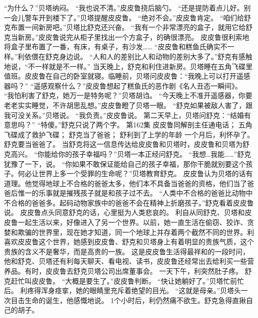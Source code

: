 \documentclass[a4paper,12pt,UTF8,twoside]{ctexbook}
\begin{document}
        “为什么？”贝塔纳闷。 
        “我也说不清。”皮皮鲁挠后脑勺。 
        “还是提防着点儿好。别一会儿警车开到楼下了。”贝塔提醒皮皮鲁。 
        “绝对不会。”皮皮鲁肯定。 
        “咱们给舒克布置一间新房吧。”贝塔比舒克还兴奋。 
        “我有一个非常漂亮的盒子，就用它给舒克当新房。”皮皮鲁说完从柜子里找出一个方盒子，的确很漂亮。 
        皮皮鲁很利索地将盒子里布置了一番，有床，有桌子，有沙发…… 
        “皮皮鲁和糕鱼氏确实不一样。”利依偎在舒克身边说。 
        “人和人的差别比人和动物的差别大多了。”舒克有感触地说，“不一样就是不一样。” 
        当天晚上，舒克和利住进新房。贝塔睡在五角飞碟里值班。皮皮鲁在自己的卧室就寝。临睡前，贝塔问皮皮鲁：“我晚上可以打开遥感器吗？” 
        “遥感观察什么？”皮皮鲁想起了糕鱼氏的恶作剧《名人丑态一瞬间》。 
        “我怕利害了舒克，她万一是特务呢？”贝塔胡诌。 
        “今天晚上不准开遥感器，你要老老实实睡觉，不许胡思乱想。”皮皮鲁瞪了贝塔一眼。 
        “舒克如果被敌人害了，跟我可没关系。”贝塔说。 
        “我负责。”皮皮鲁说。 
        第二天早上，贝塔问舒克：“结婚有意思吗？” 
        “特傻。”舒克只说了两个字。   第162集 
        皮皮鲁同解剖主任通电话； 
        五角飞碟成了救护飞碟； 
        舒克当了爸爸； 
        舒利到了上学的年龄   
        一个月后，利怀孕了。 
        舒克要当爸爸了。 
        当舒克将这一信息传达给皮皮鲁和贝塔时，皮皮鲁和贝塔为舒克高兴。 
        “你能给你的孩子幸福吗？”贝塔一本正经问舒克。 
        “我想…我能……”舒克犹豫了一下，说。 
        “你如果不敢保证能给自己的孩子幸福，那你干脆就别要这个孩子。何必让世界上多一个受罪的生命呢？”贝塔教育舒克。 
        皮皮鲁认为贝塔的话有道理。他觉得地球上不合格的爸爸太多，他们本不具备当爸爸的资格，他们当了爸爸后惟一的乐事就是摧残孩子就是和孩子过不去。 
        “人类中不合格的爸爸比动物中不合格的爸爸多。起码动物家族中的爸爸不会在精神上折磨孩子。”舒克看着皮皮鲁说。 
        皮皮鲁点头同意舒克的话，心里挺为人类悲哀的。 
        利自从同舒克、贝塔和皮皮鲁一起生活以来，好像进入了另一个世界。以前，她一直生活在偷窃、狡诈、贪婪和欺骗的世界里，现在她才知道，同一个地球上并存着两个截然不同的世界。利喜欢皮皮鲁这个世界，她感到皮皮鲁、舒克和贝塔身上有着明显的贵族气质，这个贵族的含义不是奢华，而是高贵的一族。 
        这是皮皮鲁生活得最祥和的一段时问，他和舒克、贝塔还有利每天聊天、看电视、读书，皮皮鲁还经常出去给利买一些营养品。有时，皮皮鲁去舒克贝塔公司出席董事会。 
        一天下午，利突然肚子疼。 
        舒克赶忙叫皮皮鲁。 
        “大概是要生了。”皮皮鲁判断。 
        “快让她躺好了。”贝塔忙前忙后。 
        利疼得浑身痉挛，她的眼睛里充斥着绝望的目光。 
        “这就是母亲。”贝塔头一次目击生命的诞生，他感慨地说。 
        1个小时后，利仍然痛不欲生。舒克急得直揪自己的胡子。 
\end{document}
